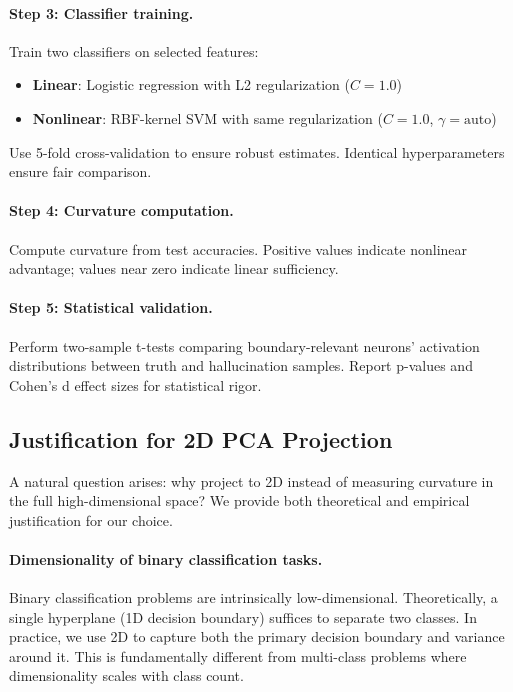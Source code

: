 \documentclass[11pt]{article}
\begin{document}
\paragraph{Step 3: Classifier training.} Train two classifiers on selected features:
\begin{itemize}
\item \textbf{Linear}: Logistic regression with L2 regularization ($C=1.0$)
\item \textbf{Nonlinear}: RBF-kernel SVM with same regularization ($C=1.0$, $\gamma=\text{auto}$)
\end{itemize}
Use 5-fold cross-validation to ensure robust estimates. Identical hyperparameters ensure fair comparison.

\paragraph{Step 4: Curvature computation.} Compute curvature from test accuracies. Positive values indicate nonlinear advantage; values near zero indicate linear sufficiency.

\paragraph{Step 5: Statistical validation.} Perform two-sample t-tests comparing boundary-relevant neurons' activation distributions between truth and hallucination samples. Report p-values and Cohen's d effect sizes for statistical rigor.

\subsection{Justification for 2D PCA Projection}
\label{sec:pca_justification}

A natural question arises: why project to 2D instead of measuring curvature in the full high-dimensional space? We provide both theoretical and empirical justification for our choice.

\paragraph{Dimensionality of binary classification tasks.}
Binary classification problems are intrinsically low-dimensional. Theoretically, a single hyperplane (1D decision boundary) suffices to separate two classes. In practice, we use 2D to capture both the primary decision boundary and variance around it. This is fundamentally different from multi-class problems where dimensionality scales with class count.
\end{document}
